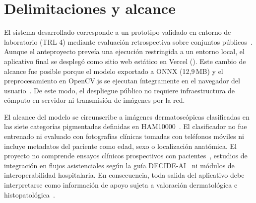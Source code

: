 \section{Delimitaciones y alcance}

El sistema desarrollado corresponde a un prototipo validado en entorno de laboratorio (TRL 4) mediante evaluación retrospectiva sobre conjuntos públicos~\cite{tschandl2018ham10000,codella2019isic2018}. Aunque el anteproyecto preveía una ejecución restringida a un entorno local, el aplicativo final se desplegó como sitio web estático en Vercel (). Este cambio de alcance fue posible porque el modelo exportado a ONNX (12,9\,MB) y el preprocesamiento en OpenCV.js se ejecutan íntegramente en el navegador del usuario~\cite{ning2024onnxweb}. De este modo, el despliegue público no requiere infraestructura de cómputo en servidor ni transmisión de imágenes por la red.

El alcance del modelo se circunscribe a imágenes dermatoscópicas clasificadas en las siete categorías pigmentadas definidas en HAM10000~\cite{tschandl2018ham10000}. El clasificador no fue entrenado ni evaluado con fotografías clínicas tomadas con teléfonos móviles ni incluye metadatos del paciente como edad, sexo o localización anatómica. El proyecto no comprende ensayos clínicos prospectivos con pacientes~\cite{marchetti2023proveai,heinlein2024multicenter}, estudios de integración en flujos asistenciales según la guía DECIDE-AI~\cite{vasey2022decideai} ni módulos de interoperabilidad hospitalaria. En consecuencia, toda salida del aplicativo debe interpretarse como información de apoyo sujeta a valoración dermatológica e histopatológica~\cite{amaral2025esmo}.
